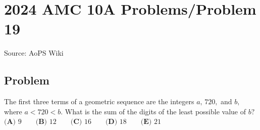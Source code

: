 \documentclass[12pt]{article}
\begin{document}
\section*{{2024 AMC 10A Problems/Problem 19}}
Source: AoPS Wiki

\subsection*{Problem}
The first three terms of a geometric sequence are the integers $a,\,720,$ and $b,$ where $a<720<b.$ What is the sum of the digits of the least possible value of $b?$ $\textbf{(A) } 9 \qquad \textbf{(B) } 12 \qquad \textbf{(C) } 16 \qquad \textbf{(D) } 18 \qquad \textbf{(E) } 21$
\end{document}
